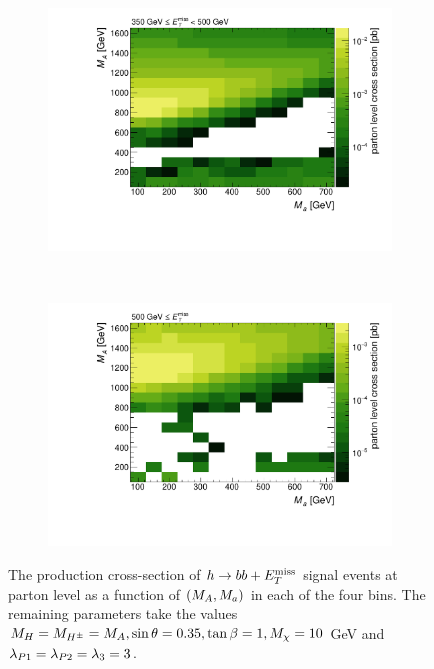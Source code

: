 \begin{figure}[tbp]
\begin{subfigure}{0.48\textwidth}
\includegraphics[width = \textwidth]{texinputs/04_grid/figures/monoHbb_parton_level_cross_section_bin_3_ma_vs_mA_lin.pdf}
\end{subfigure}
~
\begin{subfigure}{0.48\textwidth}
\includegraphics[width = \textwidth]{texinputs/04_grid/figures/monoHbb_parton_level_cross_section_bin_4_ma_vs_mA_lin.pdf}
\end{subfigure}
\caption[$h\rightarrow bb + \MET$ cross-section binned in $\MET$, $\mA$ - $\ma$ plane ]
{
The production cross-section of $h\rightarrow bb + \MET$ signal events at parton level as a function of $(M_{A},M_{a})$ in each of the four \met bins. 
The remaining parameters take the values
$ M_{H}=M_{H^{\pm}}= M_{A}, \sin\theta = 0.35, \tan\beta = 1, M_{\chi} = 10$ GeV and $ \lambda_{P1} = \lambda_{P2} = \lambda_{3} = 3 $.
}
\label{fig:monoHbb_xsec_bins_mA_ma}
\end{figure}

